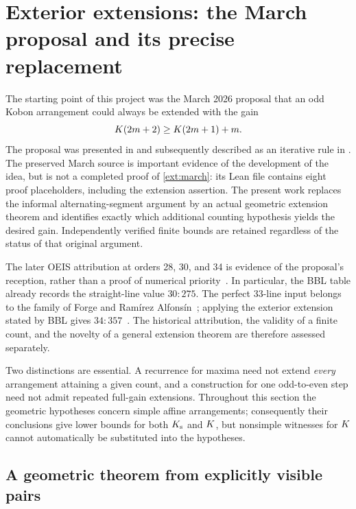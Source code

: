 \section{Exterior extensions: the March proposal and its precise replacement}
\label{ext:section}

The starting point of this project was the March 2026 proposal that an odd
Kobon arrangement could always be extended with the gain
\begin{equation}
  K(2m+2)\geq K(2m+1)+m.
  \label{ext:march}
\end{equation}
The proposal was presented in \cite{zarzuelo2026} and subsequently described
as an iterative rule in \cite{handwiki2026}.  The preserved March source is
important evidence of the development of the idea, but is not a completed
proof of \eqref{ext:march}: its Lean file contains eight proof placeholders,
including the extension assertion.  The present work replaces the informal
alternating-segment argument by an actual geometric extension theorem and
identifies exactly which additional counting hypothesis yields the desired
gain.  Independently verified finite bounds are retained regardless of the
status of that original argument.

The later OEIS attribution at orders 28, 30, and 34 is evidence of the
proposal's reception, rather than a proof of numerical
priority~\cite{oeisA006066}.  In particular, the BBL table already records
the straight-line value $30:275$.  The perfect 33-line input belongs to
the family of Forge and Ram\'irez Alfons\'in~\cite{forge1998}; applying the
exterior extension stated by BBL gives $34:357$~\cite{bbl2008}.
The historical attribution, the validity of a finite count, and the
novelty of a general extension theorem are therefore assessed separately.

Two distinctions are essential.  A recurrence for maxima need not extend
\emph{every} arrangement attaining a given count, and a construction for one
odd-to-even step need not admit repeated full-gain extensions.  Throughout
this section the geometric hypotheses concern simple affine arrangements;
consequently their conclusions give lower bounds for both $K_{\mathrm{s}}$ and $K$,
but nonsimple witnesses for $K$ cannot automatically be substituted into
the hypotheses.

\subsection{A geometric theorem from explicitly visible pairs}


